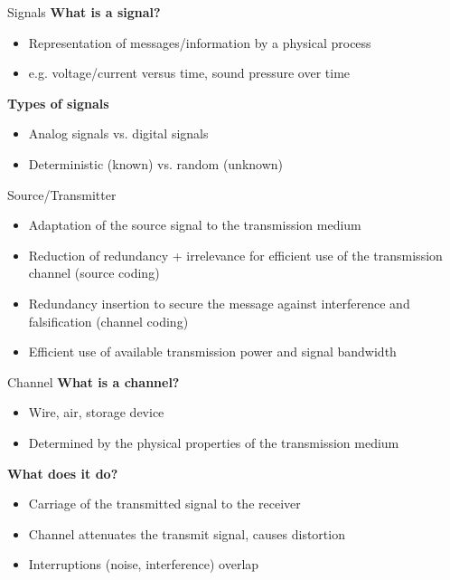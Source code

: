 \documentclass[ngerman]{beamer}
\begin{document}
\begin{frame}{Signals}
	\textbf{What is a signal?}
	\begin{itemize}[label={-}, itemsep=2ex]
		\item Representation of messages/information by a physical process
		\item e.g. voltage/current versus time, sound pressure over time		
	\end{itemize} 
	\textbf{Types of signals}	
	\begin{itemize}[label={-}, itemsep=2ex]
		\item Analog signals vs. digital signals
		\item Deterministic (known) vs. random (unknown) 
	\end{itemize} 
\end{frame}

\begin{frame}{Source/Transmitter}
	\begin{itemize}[label={-}, itemsep=2ex]
		\item Adaptation of the source signal to the transmission medium
		\item Reduction of redundancy + irrelevance for efficient use of the transmission channel \alert{(source coding)}
		\item Redundancy insertion to secure the message against interference and falsification \alert{(channel coding)}
		\item Efficient use of available transmission power and signal bandwidth
	\end{itemize} 	
\end{frame}


\begin{frame}{Channel}
	\textbf{What is a channel?}
	\begin{itemize}[label={-}, itemsep=2ex]
		\item Wire, air, storage device
		\item Determined by the physical properties of the transmission medium
	\end{itemize} 
	\textbf{What does it do?}
	\begin{itemize}[label={-}, itemsep=2ex]
		\item Carriage of the transmitted signal to the receiver
		\item Channel attenuates the transmit signal, causes distortion
		\item Interruptions (noise, interference) overlap
		\end{itemize} 	
	\end{frame}
\end{document}
